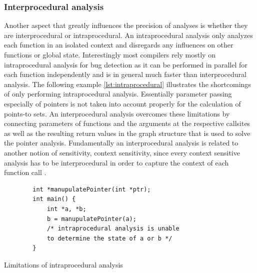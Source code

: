 \subsubsection{Interprocedural analysis}
Another aspect that greatly influences the precision of analyses is whether they are interprocedural or intraprocedural.
An intraprocedural analysis only analyzes each function in an isolated context and disregards any influences on other functions or global state.
Interestingly most compilers rely mostly on intraprocedural analysis for bug detection as it can be performed in parallel for each function independently and is in general much faster than interprocedural analysis.
The following example \ref{lst:intraprocedural} illustrates the shortcomings of only performing intraprocedural analysis. Essentially parameter passing especially of pointers is not taken into account properly for the calculation of points-to sets.
An interprocedural analysis overcomes these limitations by connecting parameters of functions and the arguments at the respective callsites as well as the resulting return values in the graph structure that is used to solve the pointer analysis.
Fundamentally an interprocedural analysis is related to another notion of sensitivity, context sensitivity, since every context sensitive analysis has to be interprocedural in order to capture the context of each function call \cite{lin2015alias}.

\begin{listing}
    \begin{verbatim}
        int *manupulatePointer(int *ptr);
        int main() {
            int *a, *b;
            b = manupulatePointer(a);
            /* intraprocedural analysis is unable 
            to determine the state of a or b */
        }
    \end{verbatim}
    \caption{Limitations of intraprocedural analysis}
    \label{lst:intraprocedural}
\end{listing}

